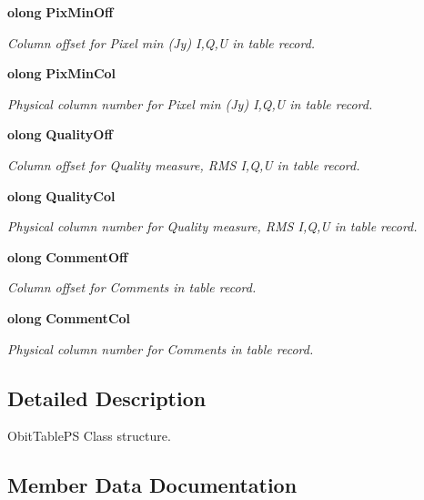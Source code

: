 \begin{CompactItemize}
{\bf olong} {\bf Pix\-Min\-Off}
\begin{CompactList}\small\item\em Column offset for Pixel min (Jy) I,Q,U in table record. \item\end{CompactList}\item 
{\bf olong} {\bf Pix\-Min\-Col}
\begin{CompactList}\small\item\em Physical column number for Pixel min (Jy) I,Q,U in table record. \item\end{CompactList}\item 
{\bf olong} {\bf Quality\-Off}
\begin{CompactList}\small\item\em Column offset for Quality measure, RMS I,Q,U in table record. \item\end{CompactList}\item 
{\bf olong} {\bf Quality\-Col}
\begin{CompactList}\small\item\em Physical column number for Quality measure, RMS I,Q,U in table record. \item\end{CompactList}\item 
{\bf olong} {\bf Comment\-Off}
\begin{CompactList}\small\item\em Column offset for Comments in table record. \item\end{CompactList}\item 
{\bf olong} {\bf Comment\-Col}
\begin{CompactList}\small\item\em Physical column number for Comments in table record. \item\end{CompactList}\end{CompactItemize}


\subsection{Detailed Description}
Obit\-Table\-PS Class structure. 



\subsection{Member Data Documentation}
